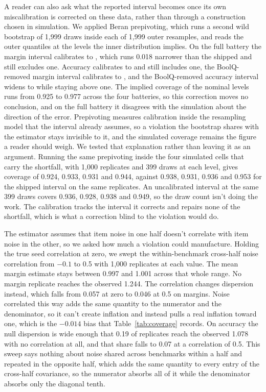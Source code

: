 A reader can also ask what the reported interval becomes once its own miscalibration is corrected on these data, rather than through a construction chosen in simulation. We applied Beran prepivoting, which runs a second wild bootstrap of 1,999 draws inside each of 1,999 outer resamples, and reads the outer quantiles at the levels the inner distribution implies. On the full battery the margin interval calibrates to , which runs 0.018 narrower than the shipped  and still excludes one. Accuracy calibrates to  and still includes one, the BoolQ-removed margin interval calibrates to , and the BoolQ-removed accuracy interval widens to  while staying above one. The implied coverage of the nominal levels runs from 0.925 to 0.977 across the four batteries, so this correction moves no conclusion, and on the full battery it disagrees with the simulation about the direction of the error. Prepivoting measures calibration inside the resampling model that the interval already assumes, so a violation the bootstrap shares with the estimator stays invisible to it, and the simulated coverage remains the figure a reader should weigh. We tested that explanation rather than leaving it as an argument. Running the same prepivoting inside the four simulated cells that carry the shortfall, with 1,000 replicates and 399 draws at each level, gives coverage of 0.924, 0.933, 0.931 and 0.944, against 0.938, 0.931, 0.936 and 0.953 for the shipped interval on the same replicates. An uncalibrated interval at the same 399 draws covers 0.936, 0.928, 0.938 and 0.949, so the draw count isn't doing the work. The calibration tracks the interval it corrects and repairs none of the shortfall, which is what a correction blind to the violation would do.

The estimator assumes that item noise in one half doesn't correlate with item noise in the other, so we asked how much a violation could manufacture. Holding the true seed correlation at zero, we swept the within-benchmark cross-half noise correlation from $-0.1$ to 0.5 with 1,000 replicates at each value. The mean margin estimate stays between 0.997 and 1.001 across that whole range. No margin replicate reaches the observed 1.244. The correlation changes dispersion instead, which falls from 0.057 at zero to 0.046 at 0.5 on margins. Noise correlated this way adds the same quantity to the numerator and the denominator, so it can't create inflation and instead pulls a real inflation toward one, which is the $-0.014$ bias that Table~\ref{tab:coverage} records. On accuracy the null dispersion is wide enough that 0.19 of replicates reach the observed 1.078 with no correlation at all, and that share falls to 0.07 at a correlation of 0.5. This sweep says nothing about noise shared across benchmarks within a half and repeated in the opposite half, which adds the same quantity to every entry of the cross-half covariance, so the numerator absorbs all of it while the denominator absorbs only the diagonal tenth.

